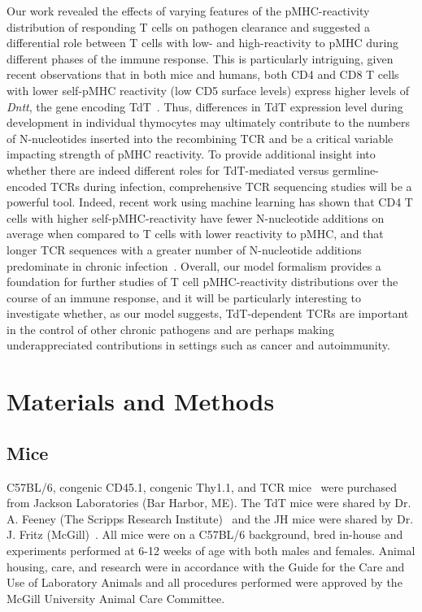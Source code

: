 Our work revealed the effects of varying features of the pMHC-reactivity distribution of responding T cells on pathogen clearance and suggested a differential role between T cells with low- and high-reactivity to pMHC during different phases of the immune response. This is particularly intriguing, given recent observations that in both mice and humans, both CD4\pos{} and CD8\pos{} T cells with lower self-pMHC reactivity (low CD5 surface levels) express higher levels of \textit{Dntt}, the gene encoding TdT~\cite{rogers2021pre,sood2021cd5,fulton2015tcr}. Thus, differences in TdT expression level during development in individual thymocytes may ultimately contribute to the numbers of N-nucleotides inserted into the recombining TCR and be a critical variable impacting strength of pMHC reactivity. To provide additional insight into whether there are indeed different roles for TdT-mediated versus germline-encoded TCRs during infection, comprehensive TCR sequencing studies will be a powerful tool. Indeed, recent work using machine learning has shown that CD4\pos{} T cells with higher self-pMHC-reactivity have fewer N-nucleotide additions on average when compared to T cells with lower reactivity to pMHC, and that longer TCR sequences with a greater number of N-nucleotide additions predominate in chronic infection~\cite{textor2022machine}. Overall, our model formalism provides a foundation for further studies of T cell pMHC-reactivity distributions over the course of an immune response, and it will be particularly interesting to investigate whether, as our model suggests, TdT-dependent TCRs are important in the control of other chronic pathogens and are perhaps making underappreciated contributions in settings such as cancer and autoimmunity.


\section{Materials and Methods}

\subsection{Mice}

C57BL/6, congenic CD45.1\pos{}, congenic Thy1.1\pos{}, and TCR\textbeta{}\KO{} mice~\cite{mombaerts1992mutations} were purchased from Jackson Laboratories (Bar Harbor, ME). The TdT\KO{} mice were shared by Dr. A. Feeney (The Scripps Research Institute)~\cite{gilfillan1993mice} and the JH\KO{} mice were shared by Dr. J. Fritz (McGill)~\cite{gu1993independent}. All mice were on a C57BL/6 background, bred in-house and experiments performed at 6-12 weeks of age with both males and females. Animal housing, care, and research were in accordance with the Guide for the Care and Use of Laboratory Animals and all procedures performed were approved by the McGill University Animal Care Committee.

